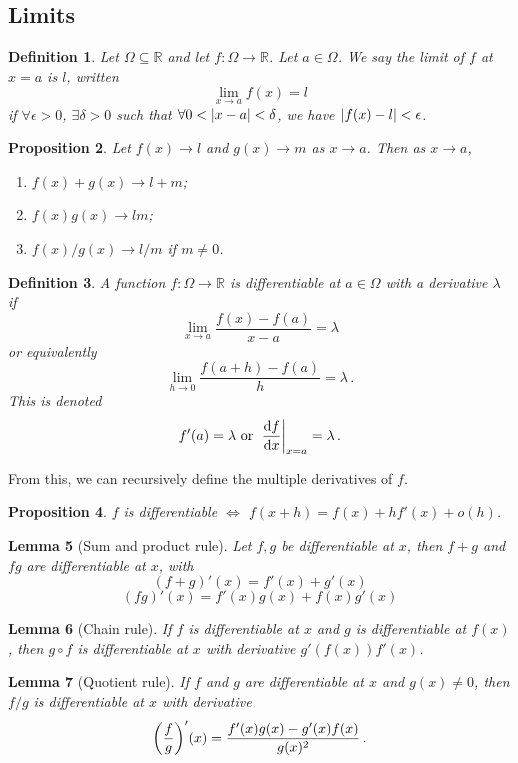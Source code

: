 \documentclass{article}
\theoremstyle{plain}\theoremheaderfont{\normalfont\itshape}\theorembodyfont{\rmfamily}\theoremseparator{.}\newtheorem*{rem}{Remark}\newtheorem*{ex}{Example}\newtheorem*{proof}{Proof}\newtheorem*{altp}{Alternative proof}
\theoremstyle{plain}\theoremheaderfont{\normalfont\bfseries}\theorembodyfont{\rmfamily}\theoremseparator{.}\newtheorem{thm}{Theorem}[section]\newtheorem{lem}[thm]{Lemma}\newtheorem{prop}[thm]{Proposition}\newtheorem*{cor}{Corollary}\newtheorem{defn}[thm]{Definition}\newtheorem{clm}[thm]{Claim}\newtheorem{clminproof}{Claim}
\theoremstyle{break}\theoremheaderfont{\normalfont\itshape}\theorembodyfont{\rmfamily}\theoremseparator{.\medskip}\newtheorem*{proofskip}{Proof}\newtheorem*{exs}{Examples}\newtheorem*{rems}{Remarks}
\theoremstyle{break}\theoremheaderfont{\normalfont\bfseries}\theorembodyfont{\rmfamily}\theoremseparator{.\medskip}\newtheorem{lemskip}[thm]{Lemma}\newtheorem{defnskip}[thm]{Definition}\newtheorem{propskip}[thm]{Proposition}\newtheorem{thmskip}[thm]{Theorem}
\begin{document}
    \subsection{Limits}
    \begin{defn}
        Let \(\Omega\subseteq\mathbb{R}\) and let \(f:\Omega\to\mathbb{R}\). Let \(a\in\Omega\). We say the \textit{limit} of \(f\) at \(x=a\) is \(l\), written
        \[\lim_{x\to a}f(x)=l\]
        if \(\forall\epsilon>0\), \(\exists\delta>0\) such that \(\forall 0<\abs{x-a}<\delta\), we have \(\abs{f(x)-l}<\epsilon\).
    \end{defn}
    \begin{prop}
        Let \(f(x)\to l\) and \(g(x)\to m\) as \(x\to a\). Then as \(x\to a\),
        \begin{enumerate}[topsep=0pt,label=(\roman*)]
            \item \(f(x)+g(x)\to l+m\);
            \item \(f(x)g(x)\to lm\);
            \item \(f(x)/g(x)\to l/m\) if \(m\ne 0\).
        \end{enumerate}
    \end{prop}
    \begin{defn}
        A function \(f:\Omega\to\mathbb{R}\) is \textit{differentiable} at \(a\in\Omega\) with a \textit{derivative} \(\lambda\) if
        \[\lim_{x\to a}\frac{f(x)-f(a)}{x-a}=\lambda\]
        or equivalently
        \[\lim_{h\to 0}\frac{f(a+h)-f(a)}{h}=\lambda\,.\]
        This is denoted
        \[f'(a)=\lambda\text{ or }\left.\dv{f}{x}\right|_{x=a}=\lambda\,.\]
    \end{defn}
    From this, we can recursively define the multiple derivatives of \(f\).
    \begin{prop}
        \(f\) is differentiable \(\iff\) \(f(x+h)=f(x)+hf'(x)+o(h)\).
    \end{prop}
    \begin{lem}[Sum and product rule]
        Let \(f,g\) be differentiable at \(x\), then \(f+g\) and \(fg\) are differentiable at \(x\), with
        \[(f+g)'(x)=f'(x)+g'(x)\]
        \[(fg)'(x)=f'(x)g(x)+f(x)g'(x)\]
    \end{lem}
    \begin{lem}[Chain rule]
        If \(f\) is differentiable at \(x\) and \(g\) is differentiable at \(f(x)\), then \(g\circ f\) is differentiable at \(x\) with derivative \(g'(f(x))f'(x)\).
    \end{lem}
    \begin{lem}[Quotient rule]
        If \(f\) and \(g\) are differentiable at \(x\) and \(g(x)\ne 0\), then \(f/g\) is differentiable at \(x\) with derivative
        \[\qty(\frac{f}{g})'(x)=\frac{f'(x)g(x)-g'(x)f(x)}{g(x)^2}\,.\]
    \end{lem}
\end{document}
